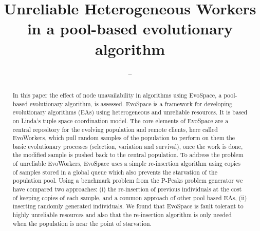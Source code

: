 \documentclass{llncs}
\begin{document}
\title{ Unreliable Heterogeneous Workers in a pool-based evolutionary algorithm }
%
%
\author{--}

\maketitle              %

\begin{abstract}
	In this paper the effect of node unavailability in algorithms using
	EvoSpace, a pool-based evolutionary algorithm, is assessed. EvoSpace is
	a framework for developing evolutionary algorithms (EAs) using 
	heterogeneous and unreliable resources. It is based on Linda's tuple
	space coordination model. The core elements of EvoSpace are a central 
	repository for the evolving population and remote clients, here called EvoWorkers,
	which pull random samples of the population to perform on them the basic evolutionary
	processes (selection, variation and survival), once the work is done, the
	modified sample is pushed back to the central population. To address the problem 
	of unreliable EvoWorkers, EvoSpace uses a simple re-insertion algorithm using copies of
	samples stored in a global queue which also prevents the starvation of the population pool.
	Using a benchmark problem from the P-Peaks problem generator
        we have compared two approaches: 
	(i) the re-insertion of previous individuals at the cost of keeping copies of each sample, 
	and a common approach of other pool based EAs, (ii) inserting  randomly generated
	individuals. We found that EvoSpace is fault tolerant to highly unreliable resources and
	also that the re-insertion algorithm is only needed when the population is near the point of starvation.
\end{abstract}
%
\end{document}
